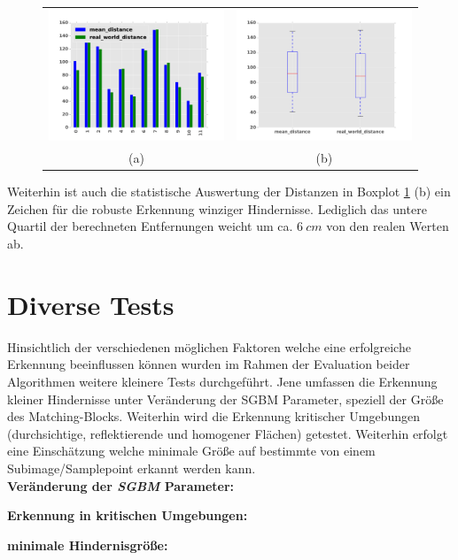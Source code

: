 	\begin{figure}[h]
		\centering
		\begin{tabular}{cc}
		\includegraphics[width=7cm]{img/evaluation/sample_tiny_bar}&
		\includegraphics[width=7cm]{img/evaluation/sample_tiny_box}\\
		 (a) & (b)
		\end{tabular}
		\caption{}
	    \label{fig:sample_eval_tiny}
	\end{figure}
	
	\noindent
	Weiterhin ist auch die statistische Auswertung der Distanzen in Boxplot \ref{fig:sample_eval_tiny} (b) ein Zeichen für die robuste Erkennung winziger Hindernisse. Lediglich das untere Quartil der berechneten Entfernungen weicht um ca. $6\ cm$ von den realen Werten ab.

\section{Diverse Tests}
\label{sec:further_tests}

	Hinsichtlich der verschiedenen möglichen Faktoren welche eine erfolgreiche Erkennung beeinflussen können wurden im Rahmen der Evaluation beider Algorithmen weitere kleinere Tests durchgeführt. Jene umfassen die Erkennung kleiner Hindernisse unter Veränderung der SGBM Parameter, speziell der Größe des Matching-Blocks. Weiterhin wird die Erkennung kritischer Umgebungen (durchsichtige, reflektierende und homogener Flächen) getestet. Weiterhin erfolgt eine Einschätzung welche minimale Größe auf bestimmte von einem Subimage/Samplepoint erkannt werden kann.\\
	
	\noindent
	\textbf{Veränderung der \emph{SGBM} Parameter:}

	

	\noindent
	\textbf{Erkennung in kritischen Umgebungen:}



	\noindent
	\textbf{minimale Hindernisgröße:}
	
	
	

